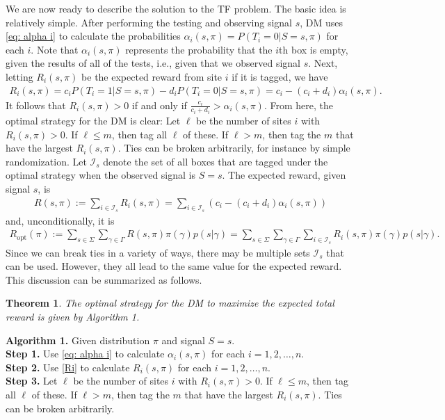 \documentclass[a4paper,11pt]{article}
\newtheorem{thrm}{Theorem}
\begin{document}
We are now ready to describe the solution to the TF problem. The basic idea is relatively simple. After performing the testing and observing signal $s$, DM uses \eqref{eq: alpha i} to calculate the probabilities $\alpha_i(s,\pi)=P(T_i=0|S=s,\pi)$ for each $i$. Note that $\alpha_i(s,\pi)$ represents the probability that the $i$th box is empty, given the results of all of the tests, i.e., given that we observed signal $s$. Next, letting $R_i(s,\pi)$ be the expected reward from site $i$ if it is tagged, we have
\begin{eqnarray}
	 R_i(s,\pi)=c_iP(T_i=1|S=s,\pi)-d_iP(T_i=0|S=s,\pi)=c_i-(c_i+d_i)\alpha_i(s,\pi). \label{Ri}
\end{eqnarray}
It follows that $R_i(s,\pi)>0$ if and only if $\frac{c_i}{c_i+d_i}>\alpha_i(s,\pi)$. From here, the optimal strategy for the DM is clear: Let $\ell$ be the number of sites $i$ with $R_i(s,\pi)>0$. If $\ell\le m$, then tag all $\ell$ of these. If $\ell>m$, then tag the $m$ that have the largest $R_i(s,\pi)$. Ties can be broken arbitrarily, for instance by simple randomization. Let $\mathcal I_s$ denote the set of all boxes that are tagged under the optimal strategy when the observed signal is $S=s$. The expected reward, given signal $s$, is
\begin{eqnarray*}
	R(s,\pi) := \sum_{i\in\mathcal I_s} R_i(s,\pi)= \sum_{i\in\mathcal I_s} \left(c_i-(c_i+d_i)\alpha_i(s,\pi)\right)
\end{eqnarray*}
and, unconditionally, it is
\begin{eqnarray}\label{eq: expected reward}
R_{\mathrm{opt}}(\pi) := \sum_{s\in\Sigma}\sum_{\gamma\in\Gamma} R(s,\pi) \pi(\gamma)p(s|\gamma) = \sum_{s\in\Sigma}\sum_{\gamma\in\Gamma} \sum_{i\in\mathcal I_s} R_i(s,\pi) \pi(\gamma)p(s|\gamma).
\end{eqnarray}
Since we can break ties in a variety of ways, there may be multiple sets $\mathcal I_s$ that can be used. However, they all lead to the same value for the expected reward. This discussion can be summarized as follows.

\begin{thrm}
The optimal  strategy for the DM to maximize the expected total reward is given by Algorithm 1.
\end{thrm}

\noindent\textbf{Algorithm 1.} Given distribution $\pi$ and signal $S=s$.\\
\textbf{Step 1.} Use \eqref{eq: alpha i} to calculate $\alpha_i(s,\pi)$ for each $i=1,2,\dots,n$.\\
\textbf{Step 2.} Use \eqref{Ri} to calculate $R_i(s,\pi)$ for each $i=1,2,\dots,n$.\\
\textbf{Step 3.}  Let $\ell$ be the number of sites $i$ with $R_i(s,\pi)>0$. If $\ell\le m$, then tag all $\ell$ of these. If $\ell>m$, then tag the $m$ that have the largest $R_i(s,\pi)$. Ties can be broken arbitrarily.\\
\end{document}
